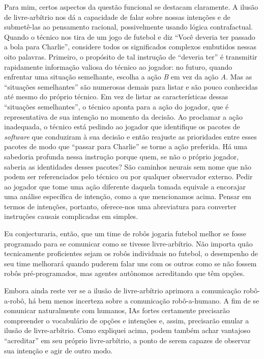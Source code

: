 \documentclass[11pt,a5paper,twoside]{book}
\begin{document}
Para mim, certos aspectos da questão funcional se destacam claramente. A ilusão de livre-arbítrio nos dá a capacidade de falar sobre nossas intenções e de submetê-las ao pensamento racional, possivelmente usando lógica contrafactual. Quando o técnico nos tira de um jogo de futebol e diz “Você deveria ter passado a bola para Charlie”, considere todos os significados complexos embutidos nessas oito palavras. Primeiro, o propósito de tal instrução de “deveria ter” é transmitir rapidamente informação valiosa do técnico ao jogador: no futuro, quando enfrentar uma situação semelhante, escolha a ação \textit{B} em vez da ação \textit{A}. Mas as “situações semelhantes” são numerosas demais para listar e são pouco conhecidas até mesmo do próprio técnico. Em vez de listar as características dessas “situações semelhantes”, o técnico aponta para a ação do jogador, que é representativa de sua intenção no momento da decisão. Ao proclamar a ação inadequada, o técnico está pedindo ao jogador que identifique os pacotes de \textit{software} que conduziram à sua decisão e então reajuste as prioridades entre esses pacotes de modo que “passar para Charlie” se torne a ação preferida. Há uma sabedoria profunda nessa instrução porque quem, se não o próprio jogador, saberia as identidades desses pacotes? São caminhos neurais sem nome que não podem ser referenciados pelo técnico ou por qualquer observador externo. Pedir ao jogador que tome uma ação diferente daquela tomada equivale a encorajar uma análise específica de intenção, como a que mencionamos acima. Pensar em termos de intenções, portanto, oferece-nos uma abreviatura para converter instruções causais complicadas em simples.

Eu conjecturaria, então, que um time de robôs jogaria futebol melhor se fosse programado para se comunicar como se tivesse livre-arbítrio. Não importa quão tecnicamente proficientes sejam os robôs individuais no futebol, o desempenho de seu time melhorará quando puderem falar uns com os outros como se não fossem robôs pré-programados, mas agentes autônomos acreditando que têm opções.

Embora ainda reste ver se a ilusão de livre-arbítrio aprimora a comunicação robô-a-robô, há bem menos incerteza sobre a comunicação robô-a-humano. A fim de se comunicar naturalmente com humanos, IAs fortes certamente precisarão compreender o vocabulário de opções e intenções e, assim, precisarão emular a ilusão de livre-arbítrio. Como expliquei acima, podem também achar vantajoso “acreditar” em seu próprio livre-arbítrio, a ponto de serem capazes de observar sua intenção e agir de outro modo.
\end{document}
